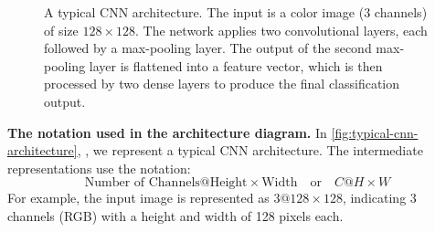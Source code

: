 \begin{figure}[!htp]
    \caption{A typical CNN architecture. The input is a color image (3 channels) of size $128\times128$. The network applies two convolutional layers, each followed by a max-pooling layer. The output of the second max-pooling layer is flattened into a feature vector, which is then processed by two dense layers to produce the final classification output.}
    \label{fig:typical-cnn-architecture}
\end{figure}

\hfill

\newpage

\noindent
\textcolor{Green3}{ \textbf{The notation used in the architecture diagram.}} In \autoref{fig:typical-cnn-architecture}, , we represent a typical CNN architecture. The intermediate representations use the notation:
\begin{equation*}
    \text{Number of Channels} @ \text{Height} \times \text{Width} \quad \text{or} \quad C @ H \times W
\end{equation*}
For example, the input image is represented as $3@128\times128$, indicating 3 channels (RGB) with a height and width of 128 pixels each.


